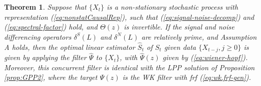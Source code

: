 \documentclass[a4paper]{book}
\newtheorem{Theorem}{Theorem}
\begin{document}
 

 
 
 
\begin{Theorem}
\label{thm:asym.sigex}
 Suppose that $\{ X_t \}$ is  a non-stationary stochastic process
 with representation (\ref{eq:nonstatCausalRep}), such that
 (\ref{eq:signal-noise-decomp}) and (\ref{eq:spectral-factor}) hold,
  and $\Theta (z)$ is invertible.
 If the signal and noise differencing operators
 $\delta^S (L)$ and $\delta^N (L)$ are relatively prime, and Assumption A holds,
 then  the  optimal linear estimator $\widehat{S}_t$   of $S_t$ given data 
  $\{ X_{t-j}, j \geq 0 \}$ is   given by
 applying the filter $\widehat{\Psi} $  to $\{  X_t \}$, 
 with $\widehat{\Psi} (z)$  given by (\ref{eq:wiener-hopf}). 
 Moreover, this concurrent filter is identical with
 the LPP solution of Proposition \ref{prop:GPP2}, where the target 
 $\Psi (z)$ is the WK filter with frf (\ref{eq:wk.frf-gen}).
\end{Theorem}
 
\end{document}
